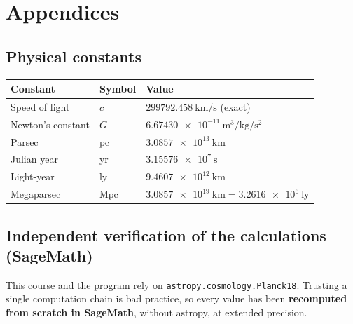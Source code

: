 \documentclass[11pt,a4paper,openany]{report}
\newcommand{\Mpc}{\text{Mpc}}
\newcommand{\ly}{\text{ly}}
\begin{document}
\clearpage

\part{Appendices}

\appendix

\chapter{Physical constants}

\begin{center}
\renewcommand{\arraystretch}{1.3}
\begin{tabular}{lll}
\toprule
\textbf{Constant} & \textbf{Symbol} & \textbf{Value} \\
\midrule
Speed of light & $c$ & $\SI{299792.458}{\km\per\second}$ (exact) \\
Newton's constant & $G$ & $\SI{6.67430e-11}{\meter\cubed\per\kg\per\second\squared}$ \\
Parsec & $\text{pc}$ & $\SI{3.0857e13}{\km}$ \\
Julian year & $\text{yr}$ & $\SI{3.15576e7}{\second}$ \\
Light-year & $\ly$ & $\SI{9.4607e12}{\km}$ \\
Megaparsec & $\Mpc$ & $\SI{3.0857e19}{\km} = \num{3.2616e6}~\ly$ \\
\bottomrule
\end{tabular}
\end{center}

\chapter{Independent verification of the calculations (SageMath)}
\label{chap:verif}

This course and the program rely on \texttt{astropy.cosmology.Planck18}.
Trusting a single computation chain is bad practice, so every value has been
\textbf{recomputed from scratch in SageMath}, without astropy, at extended
precision.
\end{document}

